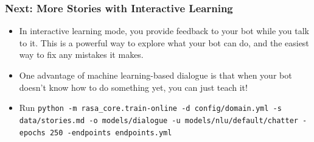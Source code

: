  \begin{frame}[fragile]\frametitle{Next: More Stories with Interactive Learning}
\begin{itemize}
\item In interactive learning mode, you provide feedback to your bot while you talk to it. This is a powerful way to explore what your bot can do, and the easiest way to fix any mistakes it makes. 
\item One advantage of machine learning-based dialogue is that when your bot doesn't know how to do something yet, you can just teach it!
\item Run \lstinline|python -m rasa_core.train-online -d config/domain.yml -s data/stories.md -o models/dialogue -u models/nlu/default/chatter -epochs 250 -endpoints endpoints.yml|
\end{itemize}
\end{frame}